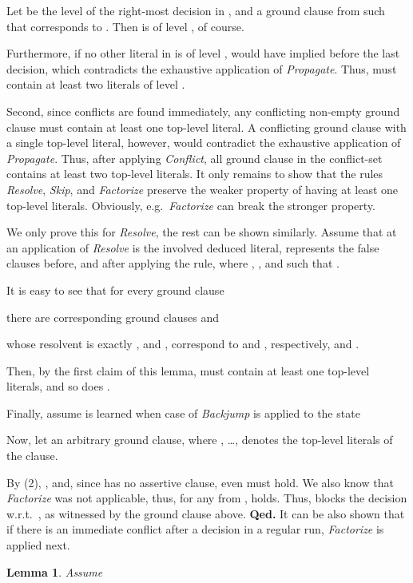 \documentclass[a4paper]{article}
\newcommand{\finishproof}{{\bf Qed.}}
\newtheorem{lemm}[defi]{Lemma}
\begin{document}
{Let  be the level of the right-most decision in , and  a ground clause from  
such that  corresponds to . 
Then  is of level , of course. 

Furthermore, if no other literal in  is of level ,  would have implied  
before the last decision, which contradicts the exhaustive application of \emph{Propagate}.
Thus,  must contain at least two literals of level .

Second, since conflicts are found immediately, any conflicting non-empty ground clause  must contain at least one top-level literal. 
A conflicting ground clause with a single top-level literal, however, would contradict the exhaustive application of \emph{Propagate}.
Thus, after applying \emph{Conflict}, all ground clause in the conflict-set contains at least two top-level literals. 
It only remains to show that the rules \emph{Resolve}, \emph{Skip}, and \emph{Factorize} 
preserve the weaker property of having at least one top-level literals. Obviously, e.g.\ \emph{Factorize} can break the stronger property.

We only prove this for \emph{Resolve}, the rest can be shown similarly. 
Assume that at an application of \emph{Resolve}   is the involved deduced literal, 
 represents the false clauses before, and
 after applying the rule, where 
,
, and  such that .

It is easy to see that for every ground clause 

there are corresponding ground clauses  and 
 
whose resolvent is exactly , 
and ,  correspond to  and , respectively, and .

Then, by the first claim of this lemma,  must contain at least one top-level literals, and so does .

Finally, assume  is learned when case  of \emph{Backjump} is applied to the state

Now, let  an arbitrary ground clause, 
where , \dots,  denotes the top-level literals of the clause.

By (2), , and, since  has no assertive clause, even  must hold. 
We also know that \emph{Factorize} was not applicable, thus, for any  from , 
 holds.
Thus,  blocks the decision  w.r.t.\
, as witnessed by the ground clause above.
\finishproof\leaveabit
\indent
It can be also shown that if there is an immediate conflict after a decision in a regular run, \emph{Factorize} is applied next.

\begin{lemm}\label{lemmImmConfFact} Assume 


\end{lemm}}
\end{document}
